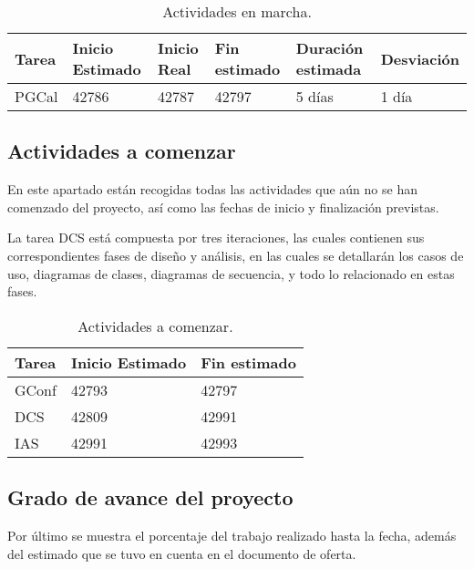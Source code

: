\begin{table}[h]
\begin{center}
\begin{tabular}{ l l l l l l}

	Tarea & Inicio Estimado & Inicio Real & Fin estimado & Duración estimada & Desviación \\ \hline \hline
	PGCal & 42786 & 42787 & 42797 & 5 días & 1 día \\ \hline
\end{tabular}
\caption{Actividades en marcha.}
\label{tab:Actividades en marcha}
\end{center}
\end{table}


\subsection{Actividades a comenzar}
\par En este apartado están recogidas todas las actividades que aún no se han comenzado del proyecto, así como las fechas de inicio y finalización previstas.
\par La tarea DCS está compuesta por tres iteraciones, las cuales contienen sus correspondientes fases de diseño y análisis, en las cuales se detallarán los casos de uso, diagramas de clases, diagramas de secuencia, y todo lo relacionado en estas fases.

\begin{table}[H]
\begin{center}
\begin{tabular}{ l l l}

	Tarea & Inicio Estimado & Fin estimado \\ \hline \hline
	GConf & 42793 & 42797 \\ \hline
	DCS & 42809 & 42991 \\ \hline
	IAS & 42991 & 42993 \\ \hline
\end{tabular}
\caption{Actividades a comenzar.}
\label{tab:Actividades a comenzar}
\end{center}
\end{table}

\subsection{Grado de avance del proyecto}
\par Por último se muestra el porcentaje del trabajo realizado hasta la fecha, además del estimado que se tuvo en cuenta en el documento de oferta.

